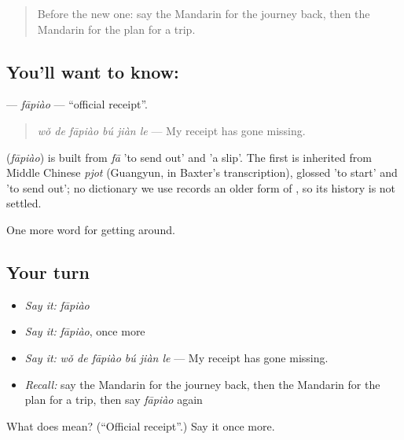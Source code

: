 \label{lesson:ZH-C428-fapiao}



\begin{quote}
Before the new one: say the Mandarin for the journey back, then the Mandarin for the plan for a trip.
\end{quote}

\subsection*{You'll want to know: }
\textbf{} — \emph{fāpiào} — \textquotedblleft{}official receipt\textquotedblright{}.

\begin{quote}
\textbf{} \emph{wǒ de fāpiào bú jiàn le} — My receipt has gone missing.
\end{quote}

\begin{cousinweb}
\textbf{} (\emph{fāpiào}) is built from \emph{fā} 'to send out' and  'a slip'. The first is inherited from Middle Chinese \emph{pjot} (Guangyun, in Baxter's transcription), glossed 'to start' and 'to send out'; no dictionary we use records an older form of , so its history is not settled.
\end{cousinweb}

\begin{grammarlens}[title={What you've built}]
One more word for getting around.
\end{grammarlens}

\subsection*{Your turn}
\begin{itemize}
\raggedright
  \item \emph{Say it:} \emph{fāpiào}
  \item \emph{Say it:} \emph{fāpiào}, once more
  \item \emph{Say it:} \emph{wǒ de fāpiào bú jiàn le} — My receipt has gone missing.
  \item \emph{Recall:} say the Mandarin for the journey back, then the Mandarin for the plan for a trip, then say \emph{fāpiào} again
\end{itemize}

\begin{tcolorbox}[breakable,colback=teal!4,colframe=teal!35!black,title={Before you move on}]
What does  mean? (\textquotedblleft{}Official receipt\textquotedblright{}.) Say it once more.
\end{tcolorbox}
